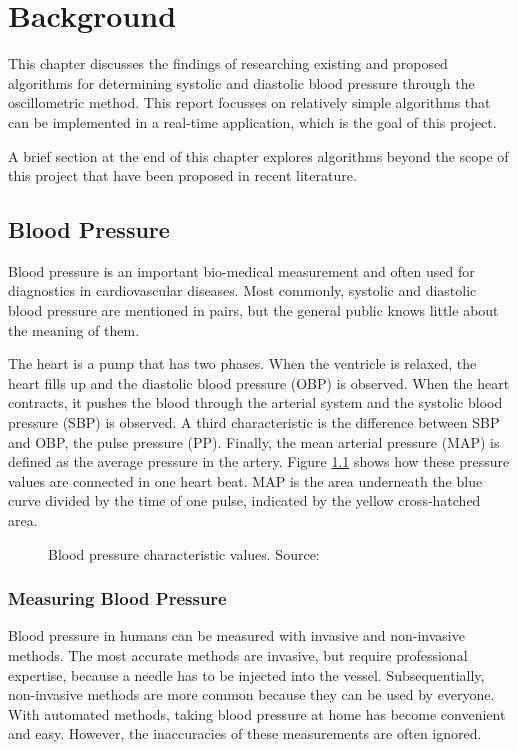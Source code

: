 \chapter{Background}\label{cp:theory} %
This chapter discusses the findings of researching existing and proposed algorithms for determining systolic and diastolic blood pressure through the oscillometric method. This report focusses on relatively simple algorithms that can be implemented in a real-time application, which is the goal of this project.

A brief section at the end of this chapter explores algorithms beyond the scope of this project that have been proposed in recent literature.
\section{Blood Pressure}
Blood pressure is an important bio-medical measurement and often used for  diagnostics in cardiovascular diseases. Most commonly, systolic and diastolic blood pressure are mentioned in pairs, but the general public knows little about the meaning of them.

The heart is a pump that has two phases. When the ventricle is relaxed, the heart fills up and the diastolic blood pressure (OBP) is observed. When the heart contracts, it pushes the blood through the arterial system and the systolic blood pressure (SBP) is observed. A third characteristic is the difference between SBP and OBP, the pulse pressure (PP). Finally, the mean arterial pressure (MAP) is defined as the average pressure in the artery. Figure \ref{fig:BP} shows how these pressure values are connected in one heart beat. MAP is the area underneath the blue curve divided by the time of one pulse, indicated by the yellow cross-hatched area. \cite{Boron2012}

\begin{figure}
\centering
\caption{Blood pressure characteristic values. Source: \cite{Boron2012}}
\label{fig:BP}
\end{figure}

\subsection{Measuring Blood Pressure}
Blood pressure in humans can be measured with invasive and non-invasive methods. The most accurate methods are invasive, but require professional expertise, because a needle has to be injected into the vessel. Subsequentially, non-invasive methods are more common because they can be used by everyone. With automated methods, taking blood pressure at home has become convenient and easy. However, the inaccuracies of these measurements are often ignored.


